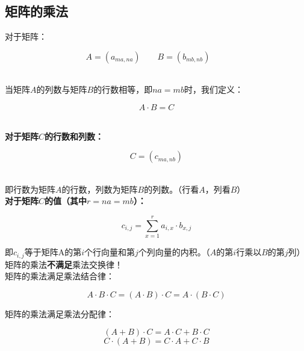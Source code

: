 \documentclass[UTF8]{ctexart}
\begin{document}
\subsection{矩阵的乘法}
    对于矩阵：
    \begin{large}
        \begin{equation*}
            A=\left(a_{ma,na}\right)\qquad
            B=\left(b_{mb,nb}\right)\qquad
        \end{equation*}
    \end{large}\\
    当矩阵$A$的列数与矩阵$B$的行数相等，即$na=mb$时，我们定义：
    \begin{large}
        \begin{equation*}
            A\cdot B=C
        \end{equation*}
    \end{large}\\
    \textbf{对于矩阵$C$的行数和列数：}
    \begin{large}
        \begin{equation*}
            C=\left(c_{ma,nb}\right)
        \end{equation*}
    \end{large}\\
    即行数为矩阵$A$的行数，列数为矩阵$B$的列数。（行看$A$，列看$B$）\\[10mm]
    \textbf{对于矩阵$C$的值（其中$r=na=mb$）：}
    \begin{large}
        \begin{equation*}
            c_{i,j}=\sum_{x=1}^{r}a_{i,x}\cdot b_{x,j}
        \end{equation*}
    \end{large}
    即$c_{i,j}$等于矩阵A的第$i$个行向量和第$j$个列向量的内积。（$A$的第$i$行乘以$B$的第$j$列）\\[10mm]
    矩阵的乘法\textbf{不满足}乘法交换律！\\[3mm]
    矩阵的乘法满足乘法结合律：
    \begin{large}
        \begin{equation*}
            A\cdot B\cdot C=(A\cdot B)\cdot C=A\cdot(B\cdot C)    
        \end{equation*}
    \end{large}
    矩阵的乘法满足乘法分配律：
    \begin{large}
        \begin{equation*}
            (A+B)\cdot C=A\cdot C+B\cdot C
        \end{equation*}
        \begin{equation*}
            C\cdot (A+B)=C\cdot A+C\cdot B
        \end{equation*}
    \end{large}
\end{document}
